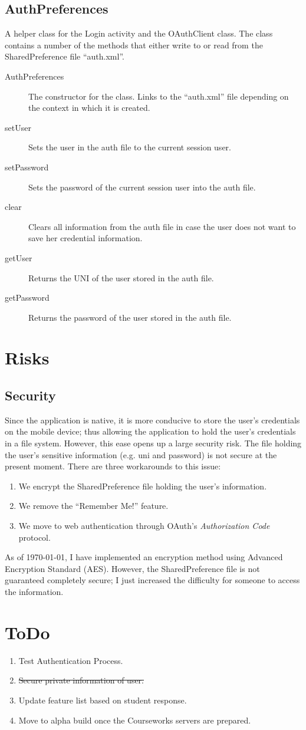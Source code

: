 \documentclass{article}
\begin{document}
\subsection{AuthPreferences}
A helper class for the Login activity and the OAuthClient class. The class contains a number of the methods that either write to or read from the SharedPreference file ``auth.xml''.
 \begin{description}
  \item[AuthPreferences] The constructor for the class. Links to the ``auth.xml'' file depending on the context in which it is created.
  \item[setUser] Sets the user in the auth file to the current session user.
  \item[setPassword] Sets the password of the current session user into the auth file.
  \item[clear] Clears all information from the auth file in case the user does not want to save her credential information.
  \item[getUser] Returns the UNI of the user stored in the auth file.
  \item[getPassword] Returns the password of the user stored in the auth file.
 \end{description}

\section{Risks}
 \subsection{Security}
Since the application is native, it is more conducive to store the user's credentials on the mobile device; thus allowing the application to hold the user's credentials in a file system. However, this ease opens up a large security risk. The file holding the user's sensitive information (e.g. uni and password) is not secure at the present moment. There are three workarounds to this issue:
  \begin{enumerate}
   \item We encrypt the SharedPreference file holding the user's information.
   \item We remove the ``Remember Me!'' feature.
   \item We move to web authentication through OAuth's \emph{Authorization Code} protocol.
  \end{enumerate}
As of \today, I have implemented an encryption method using Advanced Encryption Standard (AES). However, the SharedPreference file is not guaranteed completely secure; I just increased the difficulty for someone to access the information.

\section{ToDo}
 \begin{enumerate}
  \item Test Authentication Process.
  \item \sout{Secure private information of user.}
  \item Update feature list based on student response.
  \item Move to alpha build once the Courseworks servers are prepared.
 \end{enumerate}
\end{document}
